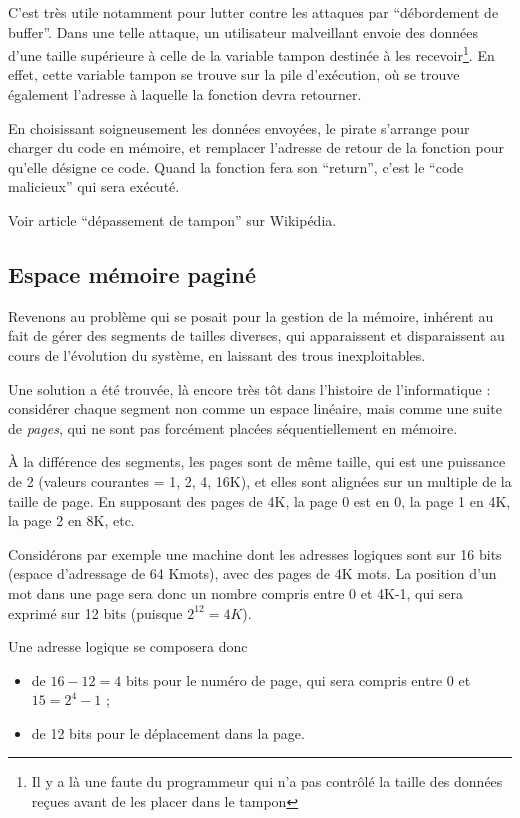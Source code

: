 \begin{multicols}{2}
C'est très utile notamment pour lutter contre les attaques par
``débordement de buffer''. Dans une telle attaque, un utilisateur
malveillant envoie des données d'une taille supérieure à celle de la
variable tampon destinée à les recevoir\footnote{Il y a là une faute
  du programmeur qui n'a pas contrôlé la taille des données reçues
  avant de les placer dans le tampon}. En effet, cette variable tampon
se trouve sur la pile d'exécution, où se trouve également l'adresse à
laquelle la fonction devra retourner.

En choisissant soigneusement les données envoyées, le pirate s'arrange
pour charger du code en mémoire, et remplacer l'adresse de retour de
la fonction pour qu'elle désigne ce code. Quand la fonction fera son
``return'', c'est le ``code malicieux'' qui sera exécuté.

Voir article ``dépassement de tampon'' sur Wikipédia.




\subsection{Espace mémoire paginé}

Revenons au problème qui se posait pour la gestion de la mémoire,
inhérent au fait de gérer des segments de tailles diverses, qui
apparaissent et disparaissent au cours de l'évolution du système, en
laissant des trous inexploitables.

Une solution a été trouvée, là encore très tôt dans l'histoire de
l'informatique : considérer chaque segment non comme un espace
linéaire, mais comme une suite de \emph{pages}, qui ne sont pas
forcément placées séquentiellement en mémoire.


À la différence des segments, les pages sont de même taille, qui est
une puissance de 2 (valeurs courantes = 1, 2, 4, 16K), et elles sont
alignées sur un multiple de la taille de page. En supposant des pages
de 4K, la page 0 est en 0, la page 1 en 4K, la page 2 en 8K, etc.


Considérons par exemple une machine dont les adresses logiques sont
sur 16 bits (espace d'adressage de 64 Kmots), avec des pages de 4K
mots. La position d'un mot dans une page sera donc un nombre compris
entre 0 et 4K-1, qui sera exprimé sur 12 bits (puisque $2^{12} =
4K$). 

Une adresse logique se composera donc
\begin{itemize}
\item de $16-12=4$ bits pour le numéro de page, qui sera compris entre
  0 et $15=2^{4}-1$ ;
\item de 12 bits pour le déplacement dans la page.
\end{itemize}


\end{multicols}
